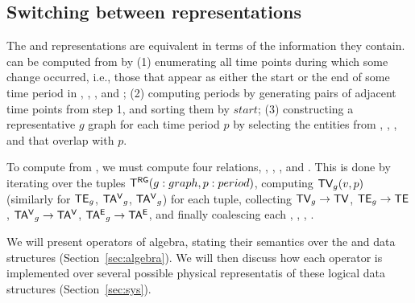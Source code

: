 \subsection{Switching between representations}  
\label{sec:model:switch}

The \trg and \tve representations are equivalent in terms of the
information they contain.  \trg can be computed from \tve by (1)
enumerating all time points during which some change occurred, i.e.,
those that appear as either the start or the end of some time period
in \tv, \te, \tav, and \tae; (2) computing \rgs periods by generating
pairs of adjacent time points from step 1, and sorting them by
$start$; (3) constructing a representative $g$ graph for each time
period $p$ by selecting the entities from \tv, \te, \tav, and \tae
that overlap with $p$.

To compute \ve from \rgs, we must compute four relations, \tv, \te,
\tav, and \tae.  This is done by iterating over the tuples $\mathsf{T^{RG}}
(g:graph,p:period)$, computing $\textsf{TV}_g(v,p)$ (similarly for $\textsf{TE}_g$,
$\mathsf{TA^{V}}_g$, $\mathsf{TA^{V}}_g$) for each tuple, collecting $\textsf{TV}_g \rightarrow
\textsf{TV}$, $\textsf{TE}_g \rightarrow \textsf{TE}$, $\mathsf{TA^{V}}_g \rightarrow \mathsf{TA^{V}}$, $\mathsf{TA^{E}}_g
\rightarrow \mathsf{TA^{E}}$, and finally coalescing each \tv, \te, \tav, \tae.

We will present operators of \tg algebra, stating their semantics over
the \rgs and \ve data structures (Section~\ref{sec:algebra}).  We will
then discuss how each operator is implemented over several possible
physical representatis of these logical data structures
(Section~\ref{sec:sys}).

